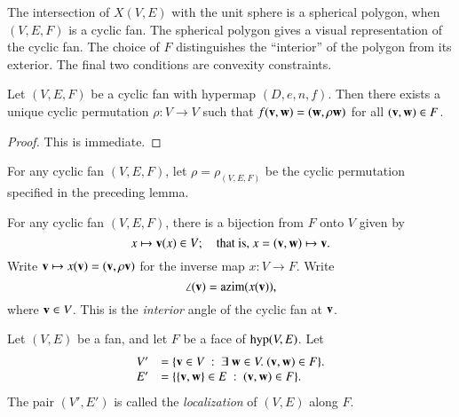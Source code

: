 The intersection of $X(V,E)$ with the unit sphere is a spherical polygon, when $(V,E,F)$ is a cyclic fan.  The spherical polygon gives a visual representation of the cyclic fan. The choice of $F$ distinguishes the ``interior'' of the polygon from its exterior.  The final two conditions are convexity constraints.



\begin{lemma}  Let $(V,E,F)$ be a cyclic fan with hypermap $(D,e,n,f)$.  Then there exists a unique cyclic permutation $\rho:V\to V$ such that
$f({\mathbf v},{\mathbf w}) = ({\mathbf w},\rho {\mathbf w})$ for all $({\mathbf v},{\mathbf w})\in F$.
\end{lemma}
%

\begin{proof}  This is immediate.
\end{proof}

\begin{definition}[$\rho$]  For any cyclic fan $(V,E,F)$, let $\rho = \rho_{(V,E,F)}$ be the
cyclic permutation specified in the preceding lemma.
\end{definition}

\begin{definition}
For any cyclic fan $(V,E,F)$, there is a bijection from $F$ onto $V$ given by
$$x\mapsto {\mathbf v}(x)\in V;\quad\text{that is, }  x = ({\mathbf v},{\mathbf w}) \mapsto {\mathbf v}.$$  
Write ${\mathbf v}\mapsto x({\mathbf v})=({\mathbf v},\rho{\mathbf v})$ for the inverse map $x:V\to F$.  Write
$$
\angle({\mathbf v}) = {\operatorname{azim}}(x({\mathbf v})),
$$
where ${\mathbf v}\in V$.  This is the {\it interior} angle of the cyclic fan at ${\mathbf v}$.
%
%
\end{definition}


\begin{definition}[localization]  Let $(V,E)$ be a fan, and let $F$ be a face of ${\operatorname{hyp}}(V,E)$.  
Let 
$$
\begin{array}{rll}
V' &= \{{\mathbf v}\in V \ :\  \exists~{\mathbf w}\in V.~({\mathbf v},{\mathbf w})\in F\}.\\
E' &= \{\{{\mathbf v},{\mathbf w}\} \in E\ :\  ({\mathbf v},{\mathbf w})\in F\}.
\end{array}
$$
The pair $(V',E')$ is called the {\it localization} of $(V,E)$ along $F$.
\end{definition}
%


